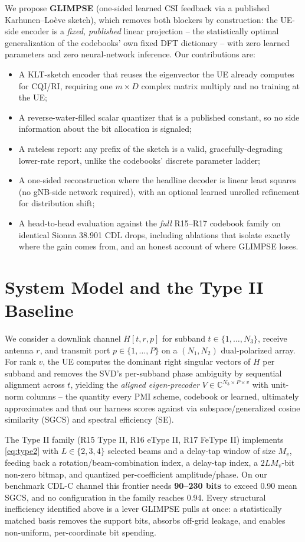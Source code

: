 \documentclass[conference]{IEEEtran}
\begin{document}
We propose \textbf{GLIMPSE} (one-sided learned CSI feedback via a published Karhunen--Lo\`{e}ve sketch), which removes both blockers by construction: the UE-side encoder is a \emph{fixed, published} linear projection -- the statistically optimal generalization of the codebooks' own fixed DFT dictionary -- with zero learned parameters and zero neural-network inference. Our contributions are:
\begin{itemize}
\item A KLT-sketch encoder that reuses the eigenvector the UE already computes for CQI/RI, requiring one $m\times D$ complex matrix multiply and no training at the UE;
\item A reverse-water-filled scalar quantizer that is a published constant, so no side information about the bit allocation is signaled;
\item A rateless report: any prefix of the sketch is a valid, gracefully-degrading lower-rate report, unlike the codebooks' discrete parameter ladder;
\item A one-sided reconstruction where the headline decoder is linear least squares (no gNB-side network required), with an optional learned unrolled refinement for distribution shift;
\item A head-to-head evaluation against the \emph{full} R15--R17 codebook family on identical Sionna 38.901 CDL drops, including ablations that isolate exactly where the gain comes from, and an honest account of where GLIMPSE loses.
\end{itemize}

\section{System Model and the Type II Baseline}
We consider a downlink channel $H[t,r,p]$ for subband $t\in\{1,\dots,N_3\}$, receive antenna $r$, and transmit port $p\in\{1,\dots,P\}$ on a $(N_1,N_2)$ dual-polarized array. For rank $v$, the UE computes the dominant right singular vectors of $H$ per subband and removes the SVD's per-subband phase ambiguity by sequential alignment across $t$, yielding the \emph{aligned eigen-precoder} $V\in\mathbb{C}^{N_3\times P\times v}$ with unit-norm columns -- the quantity every PMI scheme, codebook or learned, ultimately approximates and that our harness scores against via subspace/generalized cosine similarity (SGCS) and spectral efficiency (SE).

The Type II family (R15 Type II, R16 eType II, R17 FeType II) implements \eqref{eq:type2} with $L\in\{2,3,4\}$ selected beams and a delay-tap window of size $M_v$, feeding back a rotation/beam-combination index, a delay-tap index, a $2LM_v$-bit non-zero bitmap, and quantized per-coefficient amplitude/phase. On our benchmark CDL-C channel this frontier needs \textbf{90--230 bits} to exceed 0.90 mean SGCS, and no configuration in the family reaches 0.94. Every structural inefficiency identified above is a lever GLIMPSE pulls at once: a statistically matched basis removes the support bits, absorbs off-grid leakage, and enables non-uniform, per-coordinate bit spending.
\end{document}
